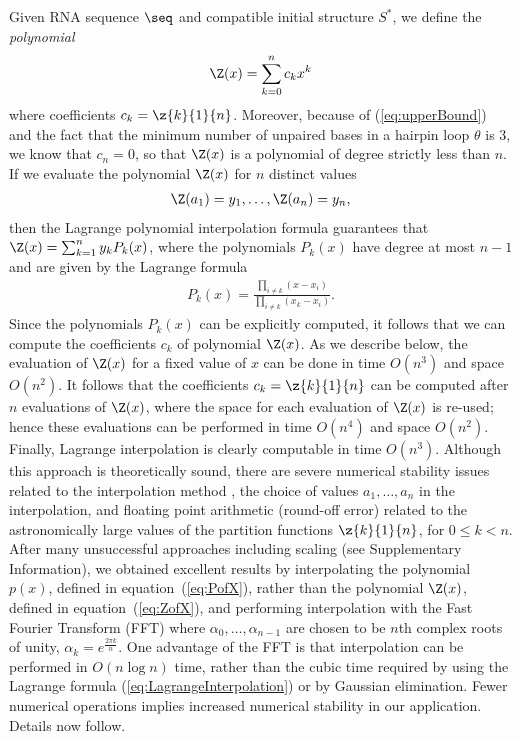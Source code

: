 Given RNA sequence $\seq$ and compatible initial structure $S^*$,
we define the {\em polynomial}
\begin{eqnarray}
\label{eq:polynomialYann}
\Z(x) = \sum_{k=0}^n c_k x^k
\end{eqnarray}
where coefficients $c_k=\z{k}{1}{n}$. Moreover, because of
(\ref{eq:upperBound}) and the fact that the minimum number of
unpaired bases in a hairpin loop $\theta$ is $3$, we know that $c_n=0$,
so that $\Z(x)$ is a polynomial of degree strictly less than $n$.
If we evaluate the polynomial $\Z(x)$ for $n$ distinct values
\begin{eqnarray}
\label{eq:ZofX}
\Z(a_1) = y_1,\ldots, \Z(a_{n}) = y_{n},
\end{eqnarray}
then the Lagrange polynomial interpolation formula guarantees that
$\Z(x) = \sum_{k=1}^n y_k P_k(x)$, where the polynomials $P_k(x)$ have degree
at most $n-1$ and are given by the Lagrange formula
\begin{eqnarray}
\label{eq:LagrangeInterpolation}
P_k(x) = \frac{\prod_{i\ne k} (x-x_i)}{\prod_{i \ne k} (x_k-x_i)}.
\end{eqnarray}
Since the polynomials $P_k(x)$ can be explicitly computed, it follows that
we can compute the coefficients $c_k$ of polynomial $\Z(x)$. As we describe
below, the evaluation of $\Z(x)$ for a fixed value of $x$ can be done in
time $O(n^3)$ and space $O(n^2)$.  It follows that the coefficients
$c_k=\z{k}{1}{n}$ can be computed after
$n$ evaluations of $\Z(x)$, where the space for each evaluation of $\Z(x)$
is re-used; hence these evaluations can be performed in time $O(n^4)$ and space
$O(n^2)$. Finally,
Lagrange interpolation is clearly computable in time $O(n^3)$.
Although this approach is theoretically sound, there are severe
numerical stability issues related to the interpolation method
\cite{HighamBarycentricInterpolation},
the choice of values $a_1,\ldots,a_{n}$ in the interpolation,
and floating point arithmetic (round-off error) related to the
astronomically large values of the partition functions
$\z{k}{1}{n}$, for $0 \leq k < n$. After many unsuccessful
approaches including scaling (see Supplementary Information),
we obtained excellent results by
interpolating the polynomial $p(x)$, defined in equation~(\ref{eq:PofX}),
rather than the polynomial $\Z(x)$, defined in equation~(\ref{eq:ZofX}),
and performing interpolation with the Fast Fourier Transform (FFT) \cite{cormen}
where $\alpha_0,\ldots,\alpha_{n-1}$ are
chosen to be $n$th complex roots of unity,
$\alpha_k = e^{\frac{2 \pi k}{n}}$.
One
advantage of the FFT is that interpolation can be performed in $O(n \log n)$
time, rather than the cubic time required by using the Lagrange formula
(\ref{eq:LagrangeInterpolation}) or by Gaussian elimination. Fewer
numerical operations implies increased numerical stability in our application.
Details now follow.

